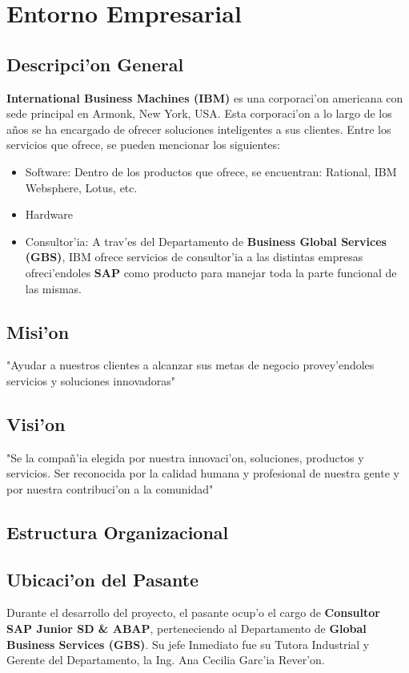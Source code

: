 \chapter{Entorno Empresarial} \label{chap:empresa}



\section{Descripci'on General} \label{sect:descripcion}
\textbf{International Business Machines (IBM)} es una corporaci'on americana con sede principal en Armonk, New York, USA. Esta corporaci'on a lo largo de los a\~nos se ha encargado de ofrecer soluciones inteligentes a sus clientes. Entre los servicios que ofrece, se pueden mencionar los siguientes:
\begin{itemize}
\item Software: Dentro de los productos que ofrece, se encuentran: Rational, IBM Websphere, Lotus, etc.
\item Hardware
\item Consultor'ia: A trav'es del Departamento de \textbf{Business Global Services (GBS)}, IBM ofrece servicios de consultor'ia a las distintas empresas ofreci'endoles \textbf{SAP} como producto para manejar toda la parte funcional de las mismas.
\end{itemize}

\section{Misi'on} \label{sect:mision}
"Ayudar a nuestros clientes a alcanzar sus metas de negocio provey'endoles servicios y soluciones innovadoras"

\section{Visi'on} \label{sect:vision}
"Se la compa\~n'ia elegida por nuestra innovaci'on, soluciones, productos y servicios. Ser reconocida por la calidad humana y profesional de nuestra gente y por nuestra contribuci'on a la comunidad"

\section{Estructura Organizacional} \label{sect:organizacion}

\section{Ubicaci'on del Pasante}
	Durante el desarrollo del proyecto, el pasante ocup'o el cargo de \textbf{Consultor SAP Junior SD & ABAP}, perteneciendo al Departamento de  \textbf{Global Business Services (GBS)}. Su jefe Inmediato fue su Tutora Industrial y Gerente del Departamento, la Ing. Ana Cecilia Garc'ia Rever'on. 